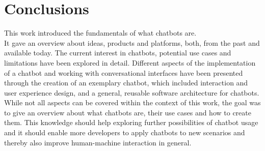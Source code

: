\chapter{Conclusions}

This work introduced the fundamentals of what chatbots are.
\\
It gave an overview about ideas, products and platforms, both, from the past and available today.
The current interest in chatbots, potential use cases and limitations have been explored in detail.
Different aspects of the implementation of a chatbot and working with conversational interfaces
have been presented through the creation of an exemplary chatbot,
which included interaction and user experience design, and a general, reusable software architecture for chatbots.
\\
While not all aspects can be covered within the context of this work,
the goal was to give an overview about what chatbots are, their use cases and how to create them.
This knowledge should help exploring further possibilities of chatbot usage
and it should enable more developers to apply chatbots to new scenarios and thereby also improve human-machine interaction in general.
